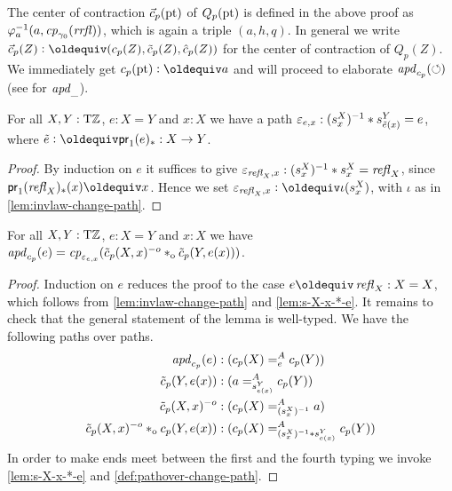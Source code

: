 \documentclass[a4,12pt]{amsart}
\begin{document}
The center of contraction $\vec{c}_p({\mathord{\mathrm{pt}}})$ of $Q_p({\mathord{\mathrm{pt}}})$ is 
defined in the above proof as $\varphi_{a}^{-1}(a,\mathit{cp}_{\gamma_0}(\mathit{rrfl}))$, 
which is again a triple $(a,h,q)$. In general we write
$\vec{c}_p(Z)\defeq(c_p(Z),\tilde{c}_p(Z),\hat{c}_p(Z))$
for the center of contraction of $Q_p(Z)$.
We immediately get $c_p(\pt)\defeq a$ and will proceed to
elaborate $\mathop{{\it apd}_{c_p}}(\circlearrowleft)$ (see \cite[Ch. 2.3]{hottbook} for $\mathop{{\it apd}_{\_}}$).


\begin{lemma}\label{lem:s-X-x-*-e}
  For all $X,Y:{\mathrm{T}\mathbb{Z}}$, $e: X=Y$ and $x:X$ we have a path 
  $\varepsilon_{e,x} : (s^X_x)^{-1} * s^Y_{\tilde {e}(x)} = e$,
  where $\ptoe{e}\defeq \mathsf{pr}_1(e)_* : X\to Y$.
\end{lemma}
\begin{proof}
By induction on $e$ it suffices to give
$\varepsilon_{\mathop{{\it refl}_{X}},x} : (s^X_x)^{-1} * s^X_x = \mathop{{\it refl}_{X}}$,
since $\mathsf{pr}_1(\refl{X})_*(x) \jdeq x$.
Hence we set $\varepsilon_{\refl{X},x} \defeq \iota(s^X_x)$,
with $\iota$ as in \cref{lem:invlaw-change-path}. 
\end{proof}


\begin{lemma}\label{lem:apd-c-tilde-c}
For all $X,Y:{\mathrm{T}\mathbb{Z}}$, $e: X=Y$ and $x:X$ we have
$\mathop{{\it apd}_{c_p}}(e) = \mathit{cp}_{\varepsilon_{e,x}}
(\tilde c_p(X,x)^{-o}*_{\mathrm{o}} \tilde c_p(Y,e(x)))$.
\end{lemma}
\begin{proof}
Induction on $e$ reduces the proof to the case $e\jdeq\refl{X}: X=X$,
which follows from \cref{lem:invlaw-change-path} and \cref{lem:s-X-x-*-e}.
It remains to check that the general statement of the lemma is well-typed.
We have the following paths over paths.
\begin{align*}
\mathop{{\it apd}_{c_p}}(e) &: (c_p(X) =^A_e c_p(Y))\\
\tilde c_p(Y,e(x)) &:  (a =^A_{s^Y_{e(x)}} c_p(Y))\\
\tilde c_p(X,x)^{-o} &: (c_p(X) =^A_{(s^X_x)^{-1}} a)\\
\tilde c_p(X,x)^{-o} *_{\mathrm{o}} c_p(Y,e(x)) &: 
     (c_p(X) =^A_{(s^X_x)^{-1}* s^Y_{e(x)}} c_p(Y))\\
\end{align*}
In order to make ends meet between the first and the fourth typing
we invoke \cref{lem:s-X-x-*-e} and \cref{def:pathover-change-path}.
\end{proof}
\end{document}
